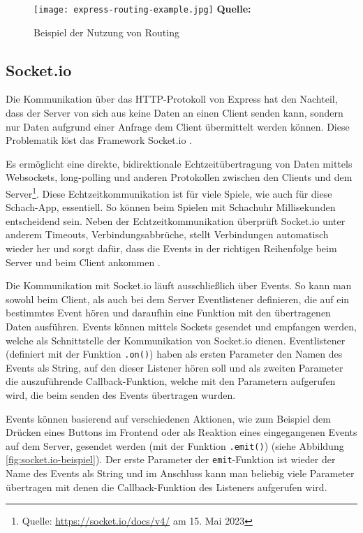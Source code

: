   \begin{figure}[ht]
  \centering
  \texttt{[image: express-routing-example.jpg]}
\raggedleft
    \footnotesize\sffamily\textbf{Quelle:} \cite{expressbook}
  \caption{Beispiel der Nutzung von Routing}
  \label{fig:routing-beispiel}
\end{figure}

        \subsection{Socket.io}
        \label{sec:socket.io}
Die Kommunikation über das HTTP-Protokoll von Express hat den Nachteil, dass der Server von sich aus keine Daten an einen Client senden kann, sondern nur Daten aufgrund einer Anfrage dem Client übermittelt werden können. Diese Problematik löst das Framework Socket.io \cite{nodejsbook}.

Es ermöglicht eine direkte, bidirektionale Echtzeitübertragung von Daten mittels Websockets, long-polling und anderen Protokollen zwischen den Clients und dem Server\footnote{Quelle: \url{https://socket.io/docs/v4/} am 15. Mai 2023}. Diese Echtzeitkommunikation ist für viele Spiele, wie auch für diese Schach-App, essentiell. So können beim Spielen mit Schachuhr Millisekunden entscheidend sein.
Neben der Echtzeitkommunikation überprüft Socket.io unter anderem Timeouts, Verbindungsabbrüche, stellt Verbindungen automatisch wieder her und sorgt dafür, dass die Events in der richtigen Reihenfolge beim Server und beim Client ankommen \cite{nodejsbook}.

Die Kommunikation mit Socket.io läuft ausschließlich über Events. So kann man sowohl beim Client, als auch bei dem Server Eventlistener definieren, die auf ein bestimmtes Event hören und daraufhin eine Funktion mit den übertragenen Daten ausführen. Events können mittels Sockets gesendet und empfangen werden, welche als Schnittstelle der Kommunikation von Socket.io dienen. Eventlistener (definiert mit der Funktion \verb|.on()|) haben als ersten Parameter den Namen des Events als String, auf den dieser Listener hören soll und als zweiten Parameter die auszuführende Callback-Funktion, welche mit den Parametern aufgerufen wird, die beim senden des Events übertragen wurden.

Events können basierend auf verschiedenen Aktionen, wie zum Beispiel dem Drücken eines Buttons im Frontend oder als Reaktion eines eingegangenen Events auf dem Server, gesendet werden (mit der Funktion \verb|.emit()|) (siehe Abbildung \ref{fig:socket.io-beispiel}). Der erste Parameter der \verb|emit|-Funktion ist wieder der Name des Events als String und im Anschluss kann man beliebig viele Parameter übertragen mit denen die Callback-Funktion des Listeners aufgerufen wird. \cite{nodejsbook}



